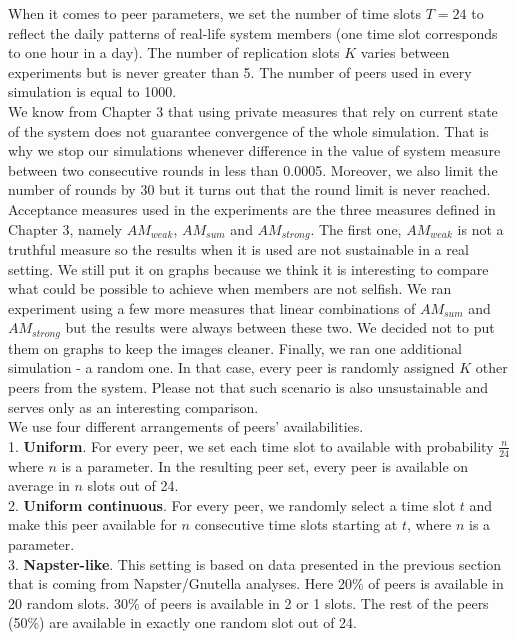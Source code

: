 \documentclass{pracamgren}
\begin{document}
When it comes to peer parameters, we set the number of time slots $T=24$ to reflect the daily patterns of real-life system members (one time slot corresponds to one hour in a day). The number of replication slots $K$ varies between experiments but is never greater than 5. The number of peers used in every simulation is equal to 1000.\\

We know from Chapter 3 that using private measures that rely on current state of the system does not guarantee convergence of the whole simulation. That is why we stop our simulations whenever difference in the value of system measure between two consecutive rounds in less than 0.0005. Moreover, we also limit the number of rounds by 30 but it turns out that the round limit is never reached.\\

Acceptance measures used in the experiments are the three measures defined in Chapter 3, namely $AM_{weak}$, $AM_{sum}$ and $AM_{strong}$. The first one, $AM_{weak}$ is not a truthful measure so the results when it is used are not sustainable in a real setting. We still put it on graphs because we think it is interesting to compare what could be possible to achieve when members are not selfish. We ran experiment using a few more measures that linear combinations of $AM_{sum}$ and $AM_{strong}$ but the results were always between these two. We decided not to put them on graphs to keep the images cleaner. Finally, we ran one additional simulation - a random one. In that case, every peer is randomly assigned $K$ other peers from the system. Please not that such scenario is also unsustainable and serves only as an interesting comparison.\\

We use four different arrangements of peers' availabilities.\\

1. {\bf Uniform}. For every peer, we set each time slot to available with probability $\frac{n}{24}$ where $n$ is a parameter. In the resulting peer set, every peer is available on average in $n$ slots out of 24.\\

2. {\bf Uniform continuous}. For every peer, we randomly select a time slot $t$ and make this peer available for $n$ consecutive time slots starting at $t$, where $n$ is a parameter. \\

3. {\bf Napster-like}. This setting is based on data presented in the previous section that is coming from Napster/Gnutella analyses. Here 20\% of peers is available in 20 random slots. 30\% of peers is available in 2 or 1 slots. The rest of the peers (50\%) are available in exactly one random slot out of 24.\\
\end{document}
